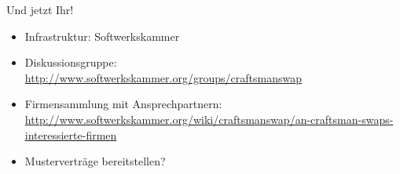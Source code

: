 \begin{frame}{Und jetzt Ihr!}

\begin{itemize}

\item Infrastruktur: Softwerkskammer

\item Diskussionsgruppe: \\ \url{http://www.softwerkskammer.org/groups/craftsmanswap}

\item Firmensammlung mit Ansprechpartnern: \\ \url{http://www.softwerkskammer.org/wiki/craftsmanswap/an-craftsman-swaps-interessierte-firmen}

\item Musterverträge bereitstellen?

\end{itemize}

\end{frame}

